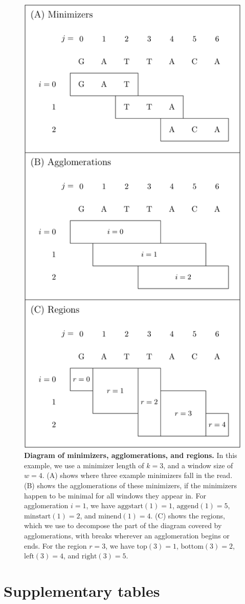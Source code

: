 \documentclass[11pt]{ucscthesis}
\newcommand{\rtop}[1]{\mathrm{top}(#1)}
\newcommand{\rbottom}[1]{\mathrm{bottom}(#1)}
\newcommand{\rleft}[1]{\mathrm{left}(#1)}
\newcommand{\rright}[1]{\mathrm{right}(#1)}
\newcommand{\minstart}[1]{\mathrm{minstart}(#1)}
\newcommand{\minend}[1]{\mathrm{minend}(#1)}
\newcommand{\aggstart}[1]{\mathrm{aggstart}(#1)}
\newcommand{\aggend}[1]{\mathrm{aggend}(#1)}
\newcommand{\faDownload}{X}
\newcommand{\indexurl}[1]{\href{#1}{\faDownload}}
\begin{document}
\begin{figure}[H]
    \includegraphics[width=.5\linewidth]{aim2_supplement_regiondiagram.pdf}
    \caption[Diagram of minimizers, agglomerations, and regions]{{\bf Diagram of minimizers, agglomerations, and regions.} In this example, we use a minimizer length of $k=3$, and a window size of $w=4$. (A) shows where three example minimizers fall in the read. (B) shows the agglomerations of these minimizers, if the minimizers happen to be minimal for all windows they appear in. For agglomeration $i=1$, we have $\aggstart{1}=1$, $\aggend{1}=5$, $\minstart{1}=2$, and $\minend{1}=4$. (C) shows the regions, which we use to decompose the part of the diagram covered by agglomerations, with breaks wherever an agglomeration begins or ends. For the region $r=3$, we have $\rtop{3}=1$, $\rbottom{3}=2$, $\rleft{3}=4$, and $\rright{3}=5$.
  }
  \label{fig:aim2_supplement_regions}
\end{figure}

\section{Supplementary tables}


\newcommand{\mapindexes}[1]{\indexurl{#1.xg} & \indexurl{#1.gcsa} & \indexurl{#1.gcsa.lcp} & & & &}
\newcommand{\giraffeindexes}[1]{\indexurl{#1.xg} & & & \indexurl{#1.gbwt} & \indexurl{#1.min} & \indexurl{#1.gg} & \indexurl{#1.dist}}
\end{document}
